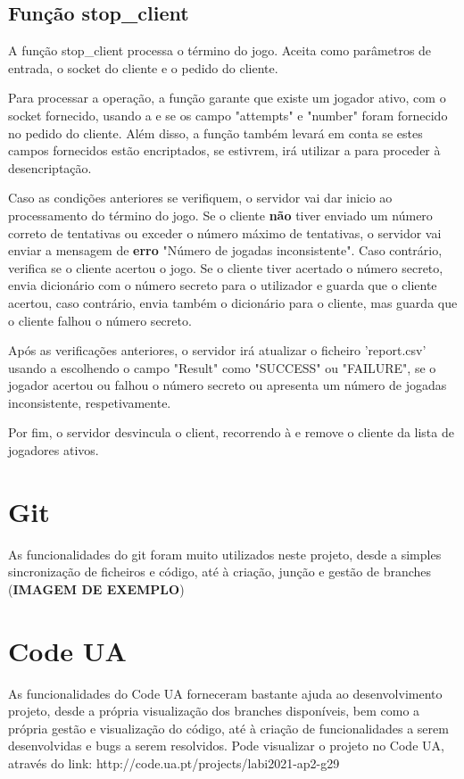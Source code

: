 \documentclass{report}
\begin{document}
\subsection{Função stop\_client}
\label{ssec:func_stop_client}

A função stop\_client processa o término do jogo. Aceita como parâmetros de entrada, o socket do cliente e o pedido do cliente.

Para processar a operação, a função garante que existe um jogador ativo, com o socket fornecido, usando a   e se os campo "attempts" e "number" foram fornecido no pedido do cliente. Além disso, a função também levará em conta se estes campos fornecidos estão encriptados, se estivrem, irá utilizar a  para proceder à desencriptação.

Caso as condições anteriores se verifiquem, o servidor vai dar inicio ao processamento do término do jogo. Se o cliente \textbf{não} tiver enviado um número correto de tentativas ou exceder o número máximo de tentativas, o servidor vai enviar a mensagem de \textbf{erro} "Número de jogadas inconsistente". Caso contrário, verifica se o cliente acertou o jogo. Se o cliente tiver acertado o número secreto, envia dicionário com o número secreto para o utilizador e guarda que o cliente acertou, caso contrário, envia também o dicionário para o cliente, mas guarda que o cliente falhou o número secreto.

Após as verificações anteriores, o servidor irá atualizar o ficheiro 'report.csv' usando a  escolhendo o campo "Result" como "SUCCESS" ou "FAILURE", se o jogador acertou ou falhou o número secreto ou apresenta um número de jogadas inconsistente, respetivamente.

Por fim, o servidor desvincula o client, recorrendo à  e remove o cliente da lista de jogadores ativos.


\section{Git}
\label{sec:git}
As funcionalidades do git foram muito utilizados neste projeto, desde a simples sincronização de ficheiros e código, até à criação, junção e gestão de branches (\textbf{IMAGEM DE EXEMPLO})

\section{Code UA}
\label{sec:git}
As funcionalidades do Code UA forneceram bastante ajuda ao desenvolvimento projeto, desde a própria visualização dos branches disponíveis, bem como a própria gestão e visualização do código, até à criação de funcionalidades a serem desenvolvidas e bugs a serem resolvidos. Pode visualizar o projeto no Code UA, através do link: http://code.ua.pt/projects/labi2021-ap2-g29
\end{document}

